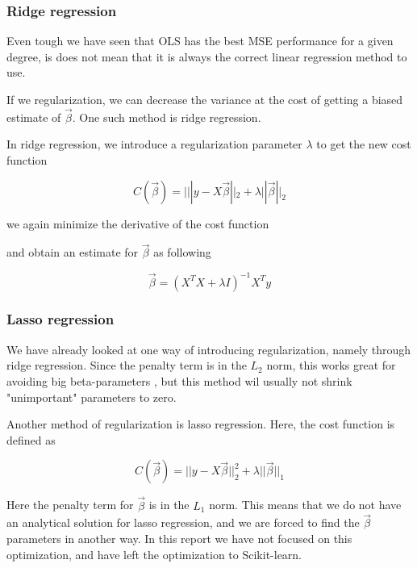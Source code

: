 \documentclass[12pt]{article}
\newcommand{\bbeta}{\vec{\beta}}
\newcommand{\hes}{X^TX}
\begin{document}
\subsubsection{Ridge regression}

Even tough we have seen that OLS has the best MSE performance for a given degree,
is does not mean that it is always the correct linear regression method to use.

If we regularization, we can decrease the variance at the cost of getting a biased estimate of $\bbeta$.
One such method is ridge regression.

In ridge regression, we introduce a regularization parameter $\lambda$ to get the new cost function

\begin{equation}\label{eq:ridge_cost}
    C(\bbeta)=|||y - X \bbeta||_2 + \lambda || \bbeta||_2
\end{equation}

we again minimize the derivative of the cost function

and obtain an estimate for $\bbeta$ as following

\begin{equation}\label{ridge}
    \bbeta=(\hes + \lambda I)^{-1} X^T y
\end{equation}

\cite{texbook}

\subsubsection{Lasso regression}

We have already looked at one way of introducing regularization, namely through ridge regression.
Since the penalty term is in the $L_2$ norm, this works great for avoiding big beta-parameters %
, but this method wil usually not shrink "unimportant" parameters to zero.

Another method of regularization is lasso regression. Here, the cost function is defined as

\begin{equation}\label{eq:lasso_cost}
    C(\bbeta)=||y-X\bbeta||_2^2+\lambda ||\bbeta||_1
\end{equation}

Here the penalty term for $\bbeta$ is in the $L_1$ norm. This means that we do not have an analytical solution for lasso regression, and we are forced to find the $\bbeta$ parameters in another way.
In this report we have not focused on this optimization, and have left the optimization to Scikit-learn.
\end{document}
